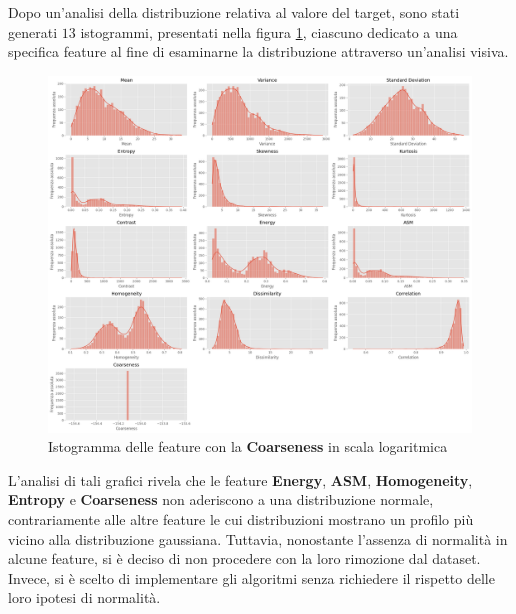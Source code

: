 Dopo un'analisi della distribuzione relativa al valore del target, sono stati
generati $13$ istogrammi, presentati nella figura \ref{fig:barplot_feature},
ciascuno dedicato a una specifica feature al fine di esaminarne la distribuzione
attraverso un'analisi visiva.
\begin{figure}[!ht]
      \centering
      \includegraphics[width=\textwidth]{img/analisi/barplot.png}
      \caption{Istogramma delle feature con la \textbf{Coarseness} in scala logaritmica}
      \label{fig:barplot_feature}
\end{figure}
L'analisi di tali grafici rivela che le feature \textbf{Energy}, \textbf{ASM},
\textbf{Homogeneity}, \textbf{Entropy} e \textbf{Coarseness} non aderiscono a
una distribuzione normale, contrariamente alle altre feature le cui distribuzioni
mostrano un profilo più vicino alla distribuzione gaussiana. Tuttavia, nonostante
l'assenza di normalità in alcune feature, si è deciso di non procedere con la
loro rimozione dal dataset. Invece, si è scelto di implementare gli algoritmi senza
richiedere il rispetto delle loro ipotesi di normalità.

